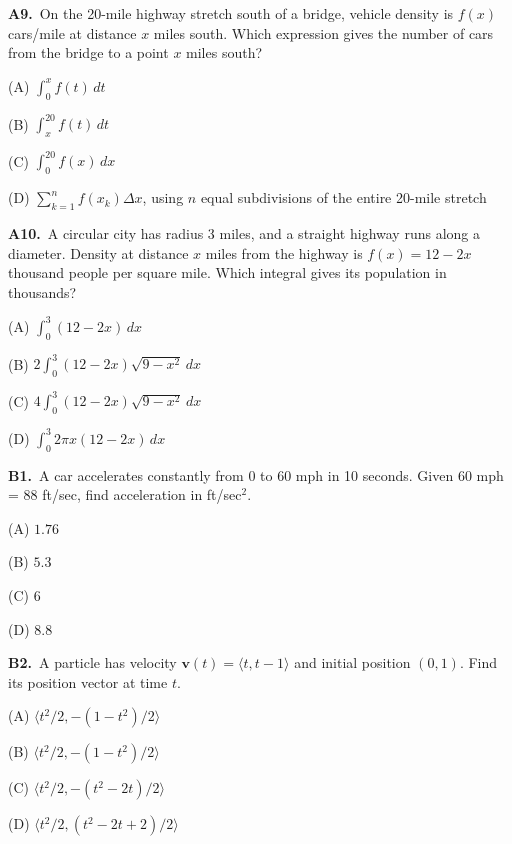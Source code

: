 \documentclass[11pt]{article}
\begin{document}
\bigskip\noindent\textbf{A9.}\ On the 20-mile highway stretch south of a bridge, vehicle density is $f(x)$ cars/mile at distance $x$ miles south. Which expression gives the number of cars from the bridge to a point $x$ miles south?
\begin{list}{}{\setlength{\leftmargin}{3em}\setlength{\labelwidth}{2.5em}\setlength{\itemsep}{0pt}\setlength{\topsep}{2pt}}
\item[(A)] $\int_0^xf(t)\,dt$
\item[(B)] $\int_x^{20}f(t)\,dt$
\item[(C)] $\int_0^{20}f(x)\,dx$
\item[(D)] $\sum_{k=1}^nf(x_k)\Delta x$, using $n$ equal subdivisions of the entire 20-mile stretch
\end{list}

\bigskip\noindent\textbf{A10.}\ A circular city has radius 3 miles, and a straight highway runs along a diameter. Density at distance $x$ miles from the highway is $f(x)=12-2x$ thousand people per square mile. Which integral gives its population in thousands?
\begin{list}{}{\setlength{\leftmargin}{3em}\setlength{\labelwidth}{2.5em}\setlength{\itemsep}{0pt}\setlength{\topsep}{2pt}}
\item[(A)] $\int_0^3(12-2x)\,dx$
\item[(B)] $2\int_0^3(12-2x)\sqrt{9-x^2}\,dx$
\item[(C)] $4\int_0^3(12-2x)\sqrt{9-x^2}\,dx$
\item[(D)] $\int_0^3 2\pi x(12-2x)\,dx$
\end{list}

\bigskip\noindent\textbf{B1.}\ A car accelerates constantly from 0 to 60 mph in 10 seconds. Given 60 mph = 88 ft/sec, find acceleration in ft/sec$^2$.
\begin{list}{}{\setlength{\leftmargin}{3em}\setlength{\labelwidth}{2.5em}\setlength{\itemsep}{0pt}\setlength{\topsep}{2pt}}
\item[(A)] $1.76$
\item[(B)] $5.3$
\item[(C)] $6$
\item[(D)] $8.8$
\end{list}

\bigskip\noindent\textbf{B2.}\ A particle has velocity $\mathbf v(t)=\langle t,t-1\rangle$ and initial position $(0,1)$. Find its position vector at time $t$.
\begin{list}{}{\setlength{\leftmargin}{3em}\setlength{\labelwidth}{2.5em}\setlength{\itemsep}{0pt}\setlength{\topsep}{2pt}}
\item[(A)] $\langle t^2/2,-(1-t^2)/2\rangle$
\item[(B)] $\langle t^2/2,-(1-t^2)/2\rangle$
\item[(C)] $\langle t^2/2,-(t^2-2t)/2\rangle$
\item[(D)] $\langle t^2/2,(t^2-2t+2)/2\rangle$
\end{list}
\end{document}
